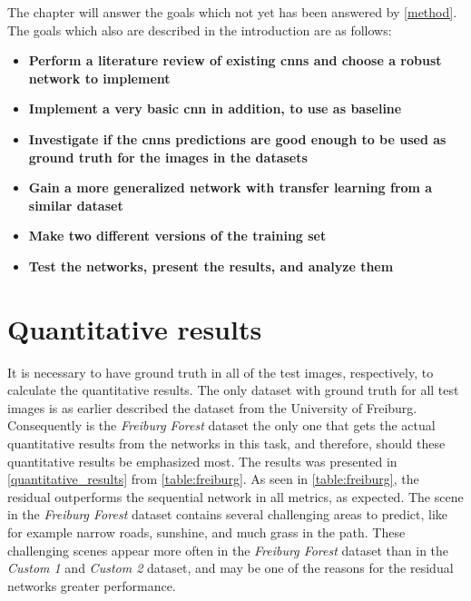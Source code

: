 \documentclass[USenglish]{ifimaster}  %
\begin{document}
The chapter will answer the goals which not yet has been answered by \cref{method}. The goals which also are described in the introduction are as follows: 
\begin{itemize}
    \item \textbf{Perform a literature review of existing \acp{cnn} and choose a robust network to implement}
    \item \textbf{Implement a very basic \ac{cnn} in addition, to use as baseline}
    \item \textbf{Investigate if the \acp{cnn} predictions are good enough to be used as ground truth for the images in the datasets}
    \item \textbf{Gain a more generalized network with transfer learning from a similar dataset}
    \item \textbf{Make two different versions of the training set}
    \item \textbf{Test the networks, present the results, and analyze them}
\end{itemize}

\section{Quantitative results}
It is necessary to have ground truth in all of the test images, respectively, to calculate the quantitative results. The only dataset with ground truth for all test images is as earlier described the dataset from the University of Freiburg. Consequently is the \textit{Freiburg Forest} dataset the only one that gets the actual quantitative results from the networks in this task, and therefore, should these quantitative results be emphasized most. The results was presented in \cref{quantitative_results} from \cref{table:freiburg}. As seen in \cref{table:freiburg}, the residual outperforms the sequential network in all metrics, as expected. The scene in the \textit{Freiburg Forest} dataset contains several challenging areas to predict, like for example narrow roads, sunshine, and much grass in the path. These challenging scenes appear more often in the \textit{Freiburg Forest} dataset than in the \textit{Custom 1} and \textit{Custom 2} dataset, and may be one of the reasons for the residual networks greater performance. 
\end{document}
